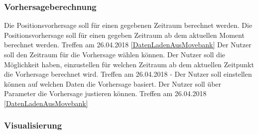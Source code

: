 \documentclass[12pt]{article} %
\begin{document}
\subsubsection{Vorhersageberechnung}

\begin{requirements}[ref={(R\arabic*)},label=(R\arabic*),resume]
{
 Die Positionsvorhersage soll für einen gegebenen Zeitraum berechnet werden. 
 }{
 Die Positionsvorhersage soll für einen gegeben Zeitraum ab dem aktuellen Moment berechnet werden. 
 }{
 Treffen am 26.04.2018 
 }{
 \ref{DatenLadenAusMovebank} 
}
{
 Der Nutzer soll den Zeitraum für die Vorhersage wählen können.
 }{
 Der Nutzer soll die Möglichkeit haben, einzustellen für welchen Zeitraum ab dem aktuellen Zeitpunkt die Vorhersage berechnet wird. 
 }{
 Treffen am 26.04.2018
 }{
 - 
}
{
 Der Nutzer soll einstellen können auf welchen Daten die Vorhersage basiert.
 }{
 Der Nutzer soll über Parameter die Vorhersage justieren können.}{
 Treffen am 26.04.2018
 }{
 \ref{DatenLadenAusMovebank} 
}
\end{requirements}

\subsubsection{Visualisierung}
\end{document}
